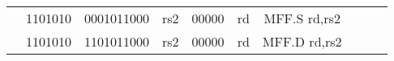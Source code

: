 \begin{table}[p]
\begin{small}
\begin{center}
\begin{tabular}{rcccccccccccl}
&
\multicolumn{1}{|c|}{1101010} &
\multicolumn{4}{c|}{0001011000} &
\multicolumn{1}{c|}{rs2} &
\multicolumn{1}{c|}{00000} &
\multicolumn{1}{c|}{rd} & MFF.S rd,rs2 \\
\cline{2-9}
  

&
\multicolumn{1}{|c|}{1101010} &
\multicolumn{4}{c|}{1101011000} &
\multicolumn{1}{c|}{rs2} &
\multicolumn{1}{c|}{00000} &
\multicolumn{1}{c|}{rd} & MFF.D rd,rs2 \\
\cline{2-9}
  

\end{tabular}
\end{center}
\end{small}

\label{instr-table}
\end{table}
  

\newpage

